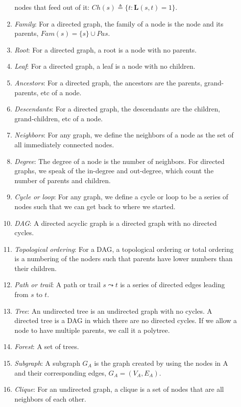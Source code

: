 \documentclass[12pt, a4paper]{article}
\begin{document}
\begin{itemize}
\begin{enumerate}
            nodes that feed out of it: $Ch(s)\triangleq\{t:\mathbf{L}(s,t)=1\}$.
            \item \textit{Family}: For a directed graph, the family of a node is the node and its 
            parents, $Fam(s)=\{ s\}\cup Pa{s}$.
            \item \textit{Root}: For a directed graph, a root is a node with no parents.
            \item \textit{Leaf}: For a directed graph, a leaf is a node with no children.
            \item \textit{Ancestors}: For a directed graph, the ancestors are the parents, grand-
            parents, etc of a node.
            \item \textit{Descendants}: For a directed graph, the descendants are the children, 
            grand-children, etc of a node.
            \item \textit{Neighbors}: For any graph, we define the neighbors of a node as the set
            of all immediately connected nodes.
            \item \textit{Degree}: The degree of a node is the number of neighbors. For directed
            graphs, we speak of the in-degree and out-degree, which count the number of parents
            and children.
            \item \textit{Cycle or loop}: For any graph, we define a cycle or loop to be a series
            of nodes such that we can get back to where we started.
            \item \textit{DAG}: A directed acyclic graph is a directed graph with no directed
            cycles.
            \item \textit{Topological ordering}: For a DAG, a topological ordering or total ordering
            is a numbering of the noders such that parents have lower numbers than their children.
            \item \textit{Path or trail}: A path or trail $s\leadsto t$ is a series of directed 
            edges leading from $s$ to $t$.
            \item \textit{Tree}: An undirected tree is an undirected graph with no cycles. A directed
            tree is a DAG in which there are no directed cycles. If we allow a node to have multiple
            parents, we call it a polytree.
            \item \textit{Forest}: A set of trees.
            \item \textit{Subgraph}: A subgraph $G_A$ is the graph created by using the nodes in A
            and their corresponding edges, $G_A=(V_A,E_A)$.
            \item \textit{Clique}: For an undirected graph, a clique is a set of nodes that are all 
            neighbors of each other. 
        \end{enumerate}
    \end{itemize}
    
\end{document}

